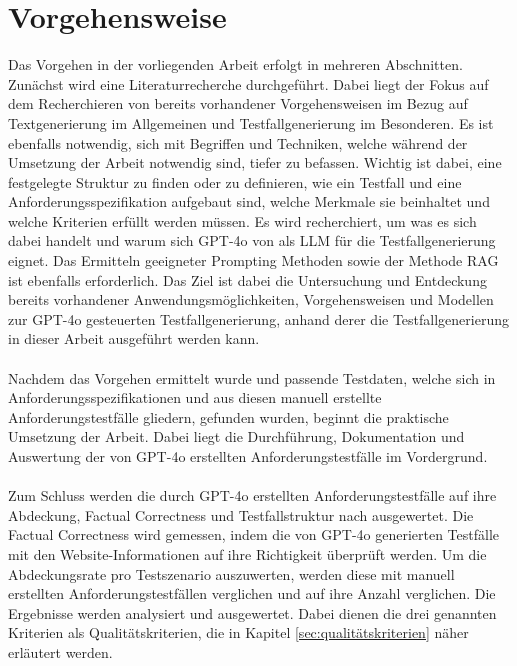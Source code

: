 \documentclass[12pt,toc=bib,toc=listof]{scrreprt}
\begin{document}
\section{Vorgehensweise} %
\label{sec:vorgehensweise}
Das Vorgehen in der vorliegenden Arbeit erfolgt in mehreren Abschnitten. Zunächst wird eine Literaturrecherche durchgeführt. Dabei liegt der Fokus auf dem Recherchieren von bereits vorhandener Vorgehensweisen im Bezug auf Textgenerierung im Allgemeinen und Testfallgenerierung im Besonderen. Es ist ebenfalls notwendig, sich mit Begriffen und Techniken, welche während der Umsetzung der Arbeit notwendig sind, tiefer zu befassen. Wichtig ist dabei, eine festgelegte Struktur zu finden oder zu definieren, wie ein Testfall und eine Anforderungsspezifikation aufgebaut sind, welche Merkmale sie beinhaltet und welche Kriterien erfüllt werden müssen. Es wird recherchiert, um was es sich dabei handelt und warum sich GPT-4o von \textcite{OpenAI2025} als LLM für die Testfallgenerierung eignet. Das Ermitteln geeigneter Prompting Methoden sowie der Methode RAG ist ebenfalls erforderlich. Das Ziel ist dabei die Untersuchung und Entdeckung bereits vorhandener Anwendungsmöglichkeiten, Vorgehensweisen und Modellen zur GPT-4o gesteuerten Testfallgenerierung, anhand derer die Testfallgenerierung in dieser Arbeit ausgeführt werden kann.\\
\\
Nachdem das Vorgehen ermittelt wurde und passende Testdaten, welche sich in Anforderungsspezifikationen und aus diesen manuell erstellte Anforderungstestfälle gliedern, gefunden wurden, beginnt die praktische Umsetzung der Arbeit. Dabei liegt die Durchführung, Dokumentation und Auswertung der von GPT-4o erstellten Anforderungstestfälle im Vordergrund.\\
\\
Zum Schluss werden die durch GPT-4o erstellten Anforderungstestfälle auf ihre Abdeckung, Factual Correctness und Testfallstruktur nach \textcite{IsoIecIeee2024} ausgewertet. Die Factual Correctness wird gemessen, indem die von GPT-4o generierten Testfälle mit den Website-Informationen auf ihre Richtigkeit überprüft werden. Um die Abdeckungsrate pro Testszenario auszuwerten, werden diese mit manuell erstellten Anforderungstestfällen verglichen und auf ihre Anzahl verglichen. Die Ergebnisse werden analysiert und ausgewertet. Dabei dienen die drei genannten Kriterien als Qualitätskriterien, die in Kapitel \ref{sec:qualitätskriterien} näher erläutert werden.
\end{document}
